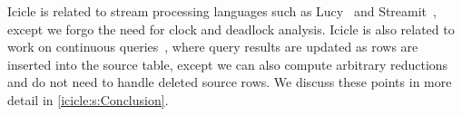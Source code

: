 
Icicle is related to stream processing languages such as Lucy~\cite{mandel2010lucy} and Streamit~\cite{thies2002streamit}, except we forgo the need for clock and deadlock analysis.
Icicle is also related to work on continuous queries~\cite{arasu2003cql}, where query results are updated as rows are inserted into the source table, except we can also compute arbitrary reductions and do not need to handle deleted source rows.
We discuss these points in more detail in \cref{icicle:s:Conclusion}.
